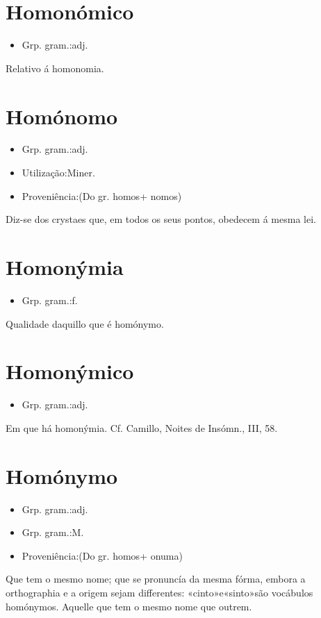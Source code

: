 \documentclass{article}
\begin{document}
\section{Homonómico}
\begin{itemize}
\item {Grp. gram.:adj.}
\end{itemize}
Relativo á homonomia.
\section{Homónomo}
\begin{itemize}
\item {Grp. gram.:adj.}
\end{itemize}
\begin{itemize}
\item {Utilização:Miner.}
\end{itemize}
\begin{itemize}
\item {Proveniência:(Do gr. \textunderscore homos\textunderscore  + \textunderscore nomos\textunderscore )}
\end{itemize}
Diz-se dos crystaes que, em todos os seus pontos, obedecem á mesma lei.
\section{Homonýmia}
\begin{itemize}
\item {Grp. gram.:f.}
\end{itemize}
Qualidade daquillo que é homónymo.
\section{Homonýmico}
\begin{itemize}
\item {Grp. gram.:adj.}
\end{itemize}
Em que há homonýmia. Cf. Camillo, \textunderscore Noites de Insómn.\textunderscore , III, 58.
\section{Homónymo}
\begin{itemize}
\item {Grp. gram.:adj.}
\end{itemize}
\begin{itemize}
\item {Grp. gram.:M.}
\end{itemize}
\begin{itemize}
\item {Proveniência:(Do gr. \textunderscore homos\textunderscore  + \textunderscore onuma\textunderscore )}
\end{itemize}
Que tem o mesmo nome; que se pronuncía da mesma fórma, embora a orthographia e a origem sejam differentes: \textunderscore «cinto»e«sinto»são vocábulos homónymos\textunderscore .
Aquelle que tem o mesmo nome que outrem.
\end{document}
